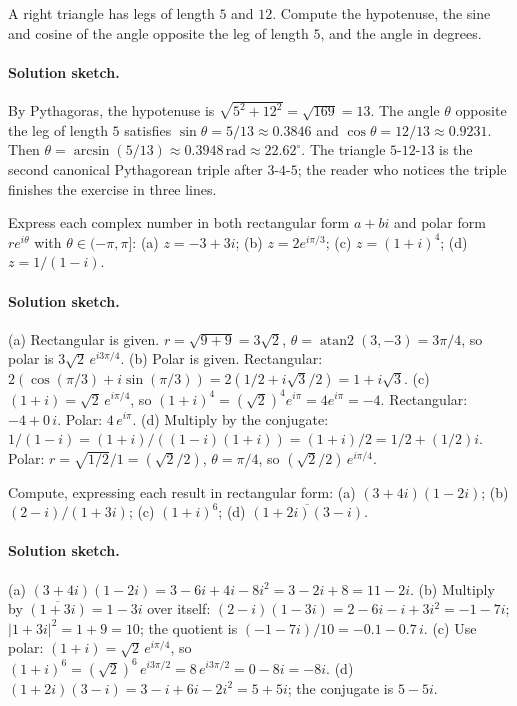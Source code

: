 \begin{exercise}
A right triangle has legs of length $5$ and $12$. Compute the
hypotenuse, the sine and cosine of the angle opposite the leg of
length $5$, and the angle in degrees.

\paragraph{Solution sketch.}
By Pythagoras, the hypotenuse is $\sqrt{5^{2} + 12^{2}} = \sqrt{169}
= 13$. The angle $\theta$ opposite the leg of length $5$ satisfies
$\sin\theta = 5/13 \approx 0.3846$ and $\cos\theta = 12/13 \approx
0.9231$. Then $\theta = \arcsin(5/13) \approx 0.3948\,\text{rad}
\approx 22.62^{\circ}$. The triangle $5$-$12$-$13$ is the second
canonical Pythagorean triple after $3$-$4$-$5$; the reader who
notices the triple finishes the exercise in three lines.
\end{exercise}

\begin{exercise}
Express each complex number in both rectangular form $a + bi$
and polar form $r e^{i\theta}$ with $\theta \in (-\pi, \pi]$:
(a) $z = -3 + 3i$; (b) $z = 2 e^{i\pi/3}$; (c) $z = (1 + i)^{4}$;
(d) $z = 1/(1 - i)$.

\paragraph{Solution sketch.}
(a) Rectangular is given. $r = \sqrt{9 + 9} = 3\sqrt{2}$,
$\theta = \operatorname{atan2}(3, -3) = 3\pi/4$, so polar is
$3\sqrt{2}\,e^{i 3\pi/4}$.
(b) Polar is given. Rectangular: $2(\cos(\pi/3) + i\sin(\pi/3)) =
2(1/2 + i\sqrt{3}/2) = 1 + i\sqrt{3}$.
(c) $(1 + i) = \sqrt{2}\,e^{i\pi/4}$, so $(1 + i)^{4} = (\sqrt{2})^{4}
e^{i\pi} = 4 e^{i\pi} = -4$. Rectangular: $-4 + 0\,i$. Polar:
$4\,e^{i\pi}$.
(d) Multiply by the conjugate: $1/(1 - i) = (1 + i)/((1 - i)(1 + i))
= (1 + i)/2 = 1/2 + (1/2)i$. Polar: $r = \sqrt{1/2}/1 = (\sqrt{2}/2)$,
$\theta = \pi/4$, so $(\sqrt{2}/2)\,e^{i\pi/4}$.
\end{exercise}

\begin{exercise}
Compute, expressing each result in rectangular form: (a) $(3 +
4i)(1 - 2i)$; (b) $(2 - i)/(1 + 3i)$; (c) $(1 + i)^{6}$; (d)
$\overline{(1 + 2i)(3 - i)}$.

\paragraph{Solution sketch.}
(a) $(3 + 4i)(1 - 2i) = 3 - 6i + 4i - 8i^{2} = 3 - 2i + 8 =
11 - 2i$.
(b) Multiply by $\overline{(1 + 3i)} = 1 - 3i$ over itself:
$(2 - i)(1 - 3i) = 2 - 6i - i + 3i^{2} = -1 - 7i$;
$|1 + 3i|^{2} = 1 + 9 = 10$; the quotient is $(-1 - 7i)/10 =
-0.1 - 0.7\,i$.
(c) Use polar: $(1 + i) = \sqrt{2}\,e^{i\pi/4}$, so
$(1 + i)^{6} = (\sqrt{2})^{6}\,e^{i 3\pi/2} = 8\,e^{i 3\pi/2} =
0 - 8i = -8i$.
(d) $(1 + 2i)(3 - i) = 3 - i + 6i - 2i^{2} = 5 + 5i$; the conjugate
is $5 - 5i$.
\end{exercise}


